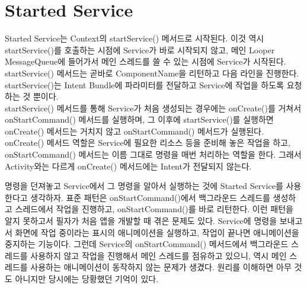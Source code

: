 \section{Started Service}
Started Service는 Context의 startService() 메서드로 시작된다. 
이것 역시 startService()를 호출하는 시점에 Service가 바로 시작되지 않고, 메인 Looper MessageQueue에 들어가서 메인 스레드를 쓸 수 있는 시점에 Service가 시작된다. 
startService() 메서드는 곧바로 ComponentName을 리턴하고 다음 라인을 진행한다. startService()는 Intent Bundle에 파라미터를 전달하고 Service에 작업을 하도록 요청하는 것 뿐이다.\\

startService() 메서드를 통해 Service가 처음 생성되는 경우에는 onCreate()를 거쳐서 onStartCommand() 메서드를 실행하며, 그 이후에 startService()를 실행하면 onCreate() 메서드는 거치지 않고 onStartCommand() 메서드가 실행된다.
onCreate() 메서드 역할은 Service에 필요한 리소스 등을 준비해 놓은 작업을 하고, onStartCommand() 메서드는 이름 그대로 명령을 매번 처리하는 역할을 한다. 그래서 Activity와는 다르게 onCreate() 메서드에는 Intent가 전달되지 않는다.\\

명령을 던져놓고 Service에서 그 명령을 알아서 실행하는 것에 Started Service를 사용한다고 생각하자.
표준 패턴은 onStartCommand()에서 백그라운드 스레드를 생성하고 
스레드에서 작업을 진행하고, onStartCommand()를 바로 리턴한다. 이런 패턴을 알지 못하고서 필자가 처음 앱을 개발할 때 겪은 문제도 있다. Service에 명령을 보내고서 화면에 작업 중이라는 표시의 애니메이션을 실행하고, 작업이 끝나면 애니메이션을 중지하는 기능이다.
그런데 Service의  onStartCommand() 메서드에서 백그라운드 스레드를 사용하지 않고 작업을 진행해서 메인 스레드를 점유하고 있으니, 역시 메인 스레드를 사용하는 애니메이션이 동작하지 않는 문제가 생겼다. 원리를 이해하면 아무 것도 아니지만 당시에는 당황했던 기억이 있다.\\

